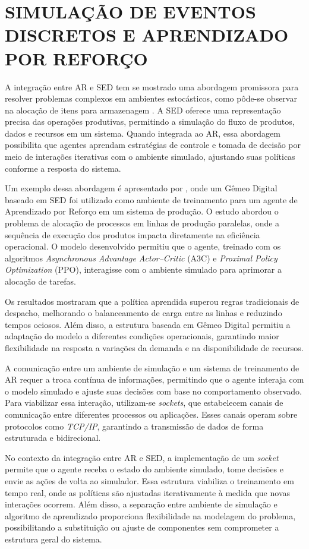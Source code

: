 \documentclass[
    12pt,                %
    openright,           %
    oneside,             %
    a4paper,             %
    english,             %
    spanish,             %
    brazil               %
]{ufscar}
\begin{document}
\section{SIMULAÇÃO DE EVENTOS DISCRETOS E APRENDIZADO POR REFORÇO}

A integração entre AR e SED tem se mostrado uma abordagem promissora para resolver problemas complexos em ambientes estocásticos, como pôde-se observar na alocação de itens para armazenagem \cite{FlexSim_RL_2023}. A SED oferece uma representação precisa das operações produtivas, permitindo a simulação do fluxo de produtos, dados e recursos em um sistema. Quando integrada ao AR, essa abordagem possibilita que agentes aprendam estratégias de controle e tomada de decisão por meio de interações iterativas com o ambiente simulado, ajustando suas políticas conforme a resposta do sistema.

Um exemplo dessa abordagem é apresentado por \cite{Damian_2024}, onde um Gêmeo Digital baseado em SED foi utilizado como ambiente de treinamento para um agente de Aprendizado por Reforço em um sistema de produção. O estudo abordou o problema de alocação de processos em linhas de produção paralelas, onde a sequência de execução dos produtos impacta diretamente na eficiência operacional. O modelo desenvolvido permitiu que o agente, treinado com os algoritmos \textit{Asynchronous Advantage Actor–Critic} (A3C) e \textit{Proximal Policy Optimization} (PPO), interagisse com o ambiente simulado para aprimorar a alocação de tarefas. 

Os resultados mostraram que a política aprendida superou regras tradicionais de despacho, melhorando o balanceamento de carga entre as linhas e reduzindo tempos ociosos. Além disso, a estrutura baseada em Gêmeo Digital permitiu a adaptação do modelo a diferentes condições operacionais, garantindo maior flexibilidade na resposta a variações da demanda e na disponibilidade de recursos. 

A comunicação entre um ambiente de simulação e um sistema de treinamento de AR requer a troca contínua de informações, permitindo que o agente interaja com o modelo simulado e ajuste suas decisões com base no comportamento observado. Para viabilizar essa interação, utilizam-se \textit{sockets}, que estabelecem canais de comunicação entre diferentes processos ou aplicações. Esses canais operam sobre protocolos como \textit{TCP/IP}, garantindo a transmissão de dados de forma estruturada e bidirecional.

No contexto da integração entre AR e SED, a implementação de um \textit{socket} permite que o agente receba o estado do ambiente simulado, tome decisões e envie as ações de volta ao simulador. Essa estrutura viabiliza o treinamento em tempo real, onde as políticas são ajustadas iterativamente à medida que novas interações ocorrem. Além disso, a separação entre ambiente de simulação e algoritmo de aprendizado proporciona flexibilidade na modelagem do problema, possibilitando a substituição ou ajuste de componentes sem comprometer a estrutura geral do sistema.
\end{document}
